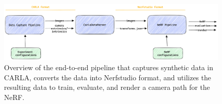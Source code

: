 \begin{figure}[ht]
    \centering
    \includegraphics[width=1.0\textwidth]{figures/end-to-end-pipeline.png}
    \caption[Overview of the end-to-end pipeline.]{Overview of the end-to-end pipeline that captures synthetic data in CARLA, converts the data into Nerfstudio format, and utilizes the resulting data to train, evaluate, and render a camera path for the NeRF.}
    \label{fig:end-to-end-pipeline}
\end{figure}